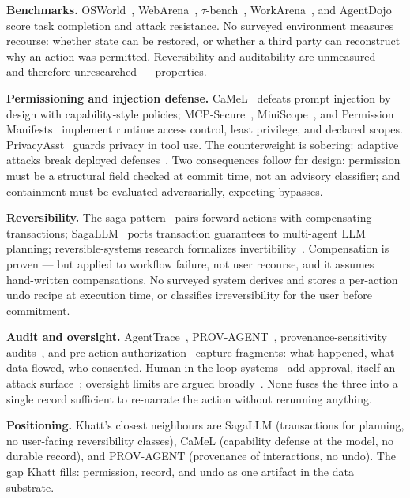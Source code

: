 \documentclass[11pt]{article}
\newcommand{\sys}{Khatt}
\begin{document}
\textbf{Benchmarks.} OSWorld~\cite{osworld}, WebArena~\cite{webarena},
$\tau$-bench~\cite{taubench}, WorkArena~\cite{workarena}, and
AgentDojo~\cite{agentdojo} score task completion and attack resistance. No
surveyed environment measures recourse: whether state can be restored, or whether
a third
party can reconstruct why an action was permitted. Reversibility and
auditability are unmeasured --- and therefore unresearched --- properties.

\textbf{Permissioning and injection defense.} CaMeL~\cite{camel} defeats prompt
injection by design with capability-style policies; MCP-Secure~\cite{mcpsecure},
MiniScope~\cite{miniscope}, and Permission Manifests~\cite{permmanifests}
implement runtime access control, least privilege, and declared scopes.
PrivacyAsst~\cite{privacyasst} guards privacy in tool use. The counterweight is
sobering: adaptive attacks break deployed defenses~\cite{adaptiveattacks}. Two
consequences follow for design: permission must be a structural field checked at
commit time, not an advisory classifier; and containment must be evaluated
adversarially, expecting bypasses.

\textbf{Reversibility.} The saga pattern~\cite{saga} pairs forward actions with
compensating transactions; SagaLLM~\cite{sagallm} ports transaction guarantees to
multi-agent LLM planning; reversible-systems research formalizes
invertibility~\cite{reversiblesurvey}. Compensation is proven --- but applied to
workflow failure, not user recourse, and it assumes hand-written compensations.
No surveyed system derives and stores a per-action undo recipe at execution time,
or classifies irreversibility for the user before commitment.

\textbf{Audit and oversight.} AgentTrace~\cite{agenttrace},
PROV-AGENT~\cite{provagent}, provenance-sensitivity audits~\cite{provsensitivity},
and pre-action authorization~\cite{preactionauthz} capture fragments: what
happened, what data flowed, who consented. Human-in-the-loop
systems~\cite{magenticui,actioncard} add approval, itself an attack
surface~\cite{loopjacking}; oversight limits are argued broadly~\cite{oversight}.
None fuses the three into a single record sufficient to re-narrate the action
without rerunning anything.

\textbf{Positioning.} \sys{}'s closest neighbours are SagaLLM (transactions for
planning, no user-facing reversibility classes), CaMeL (capability defense at the
model, no durable record), and PROV-AGENT (provenance of interactions, no undo).
The gap \sys{} fills: permission, record, and undo as one artifact in the data
substrate.
\end{document}
